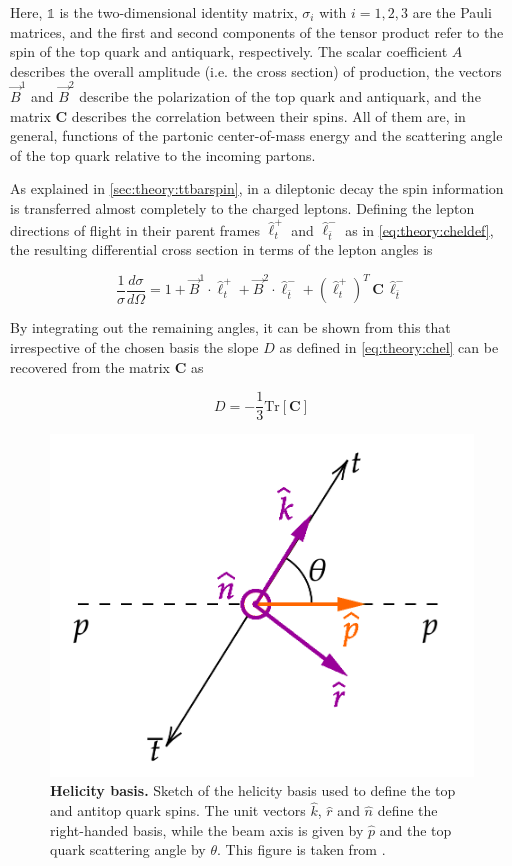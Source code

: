 Here, $\mathbb{1}$ is the two-dimensional identity matrix, $\sigma_i$ with $i=1,2,3$ are the Pauli matrices, and the first and second components of the tensor product refer to the spin of the top quark and antiquark, respectively. The scalar coefficient $A$ describes the overall amplitude (i.e. the cross section) of \ttbar production, the vectors $\vec{B}^1$ and $\vec{B}^2$ describe the polarization of the top quark and antiquark, and the matrix $\mathbf{C}$ describes the correlation between their spins. All of them are, in general, functions of the partonic center-of-mass energy and the scattering angle of the top quark relative to the incoming partons.

As explained in \cref{sec:theory:ttbarspin}, in a dileptonic decay the spin information is transferred almost completely to the charged leptons. Defining the lepton directions of flight in their parent frames $\hat{\ell}_t^+$ and $\hat{\ell}_{\bar{t}}^-$ as in \cref{eq:theory:cheldef}, the resulting differential cross section in terms of the lepton angles is~\cite{Anuar:PhD}

\begin{equation}
    \frac{1}{\sigma} \frac{d \sigma}{d \Omega} = 1 + \vec{B}^1 \cdot \hat{\ell}_t^+ + \vec{B}^2 \cdot \hat{\ell}_{\bar{t}}^- + (\hat{\ell}_t^+)^T \, \mathbf{C} \, \hat{\ell}_{\bar{t}}^-
\end{equation}

By integrating out the remaining angles, it can be shown from this that irrespective of the chosen basis the slope $D$ as defined in \cref{eq:theory:chel} can be recovered from the matrix $\mathbf{C}$ as~\cite{Bernreuther:2004jv,Bernreuther:2017yhg}

\begin{equation}
    D = - \frac{1}{3} \mathrm{Tr} \left[ \mathbf{C} \right]
\end{equation}

\begin{figure}[t]
  \centering
  \includegraphics[width=0.5\linewidth]{figures/helicity_basis.png}
  \caption{\textbf{Helicity basis.} Sketch of the helicity basis used to define the top and antitop quark spins. The unit vectors $\hat{k}$, $\hat{r}$ and $\hat{n}$ define the right-handed basis, while the beam axis is given by $\hat{p}$ and the top quark scattering angle by $\theta$. This figure is taken from .}
  \label{fig:theory:helicitybasis}
\end{figure}

